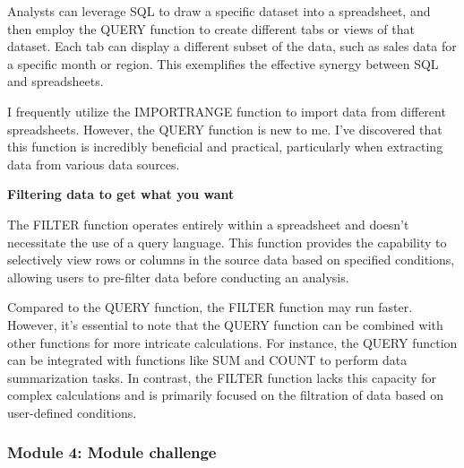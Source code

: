 \documentclass[]{article}
\begin{document}
Analysts can leverage SQL to draw a specific dataset into a spreadsheet, and then employ the QUERY function to create different tabs or views of that dataset. Each tab can display a different subset of the data, such as sales data for a specific month or region. This exemplifies the effective synergy between SQL and spreadsheets.

I frequently utilize the IMPORTRANGE function to import data from different spreadsheets. However, the QUERY function is new to me. I've discovered that this function is incredibly beneficial and practical, particularly when extracting data from various data sources.

\textbf{Filtering data to get what you want}

The FILTER function operates entirely within a spreadsheet and doesn't necessitate the use of a query language. This function provides the capability to selectively view rows or columns in the source data based on specified conditions, allowing users to pre-filter data before conducting an analysis.

Compared to the QUERY function, the FILTER function may run faster. However, it's essential to note that the QUERY function can be combined with other functions for more intricate calculations. For instance, the QUERY function can be integrated with functions like SUM and COUNT to perform data summarization tasks. In contrast, the FILTER function lacks this capacity for complex calculations and is primarily focused on the filtration of data based on user-defined conditions.

\subsubsection{Module 4: Module challenge}
\end{document}
